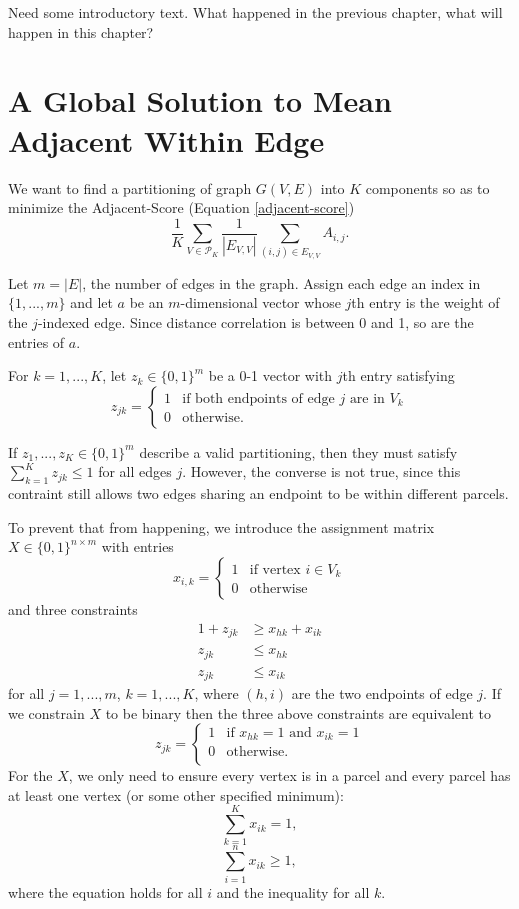 {\color{red}Need some introductory text. What happened in the previous chapter,
what will happen in this chapter?}

\section{A Global Solution to Mean Adjacent Within Edge}


We want to find a partitioning of graph $G(V,E)$ into $K$ components
so as to minimize the Adjacent-Score (Equation \ref{adjacent-score})
\[ \frac{1}{K} \sum_{V \in \mathcal{P}_K}
   \frac{1}{|E_{V,V}|} \sum_{(i,j) \in E_{V,V}} A_{i,j}.
\]

Let $m = |E|$, the number of edges in the graph. Assign each edge an
index in $\{1, ..., m\}$ and 
let $a$ be an $m$-dimensional vector whose $j$th entry is the weight of
the $j$-indexed edge. Since distance correlation is between 0 and 1, so
are the entries of $a$.

For $k = 1, ..., K$, let $z_k \in \{0, 1\}^m$ be a 0-1 vector with
$j$th entry satisfying
\[ z_{jk} = \begin{cases}
  1 & \text{if both endpoints of edge } j \text{ are in } V_k \\
  0 & \text{otherwise}.
\end{cases} \]

If $z_1, ..., z_K \in \{0, 1\}^m$ describe a valid partitioning, then
they must satisfy $\sum_{k=1}^K z_{jk} \leq 1$ for all edges $j$.
However, the converse is not true, since this contraint still allows two
edges sharing an endpoint to be within different parcels.

To prevent that from happening, we introduce the assignment matrix
$X \in \{0, 1\}^{n \times m}$ with entries
\[ x_{i,k} = \begin{cases}
  1 & \text{if vertex } i \in V_k \\
  0 & \text{otherwise}
\end{cases} \]
and three constraints
\begin{align*}
1 + z_{jk} &\geq x_{hk} + x_{ik} \\
z_{jk} &\leq x_{hk} \\
z_{jk} &\leq x_{ik}
\end{align*}
for all $j = 1, ..., m$, $k = 1, ..., K$, where $(h,i)$ are the two
endpoints of edge $j$. If we constrain $X$ to be binary then the three
above constraints are equivalent to
\[ z_{jk} = \begin{cases}
  1 & \text{if } x_{hk} = 1 \text{ and } x_{ik} = 1 \\
  0 & \text{otherwise}. \\
\end{cases}\]
For the $X$, we only need to ensure every vertex is in a parcel and every
parcel has at least one vertex (or some other specified minimum):
\[ \sum_{k=1}^K x_{ik} = 1, \]
\[ \sum_{i=1}^n x_{ik} \geq 1, \]
where the equation holds for all $i$ and the inequality for all $k$.

